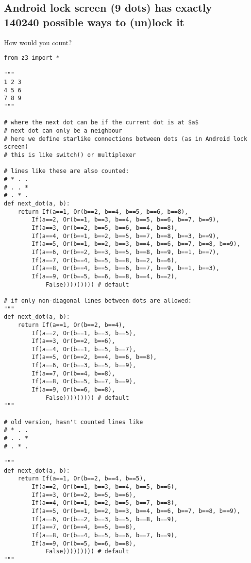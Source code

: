 \subsection{Android lock screen (9 dots) has exactly 140240 possible ways to (un)lock it}

How would you count?

\begin{lstlisting}[style=custompy]
from z3 import *

"""
1 2 3
4 5 6
7 8 9
"""

# where the next dot can be if the current dot is at $a$
# next dot can only be a neighbour
# here we define starlike connections between dots (as in Android lock screen)
# this is like switch() or multiplexer

# lines like these are also counted:
# * . .
# . . *
# . * .
def next_dot(a, b):
    return If(a==1, Or(b==2, b==4, b==5, b==6, b==8),
        If(a==2, Or(b==1, b==3, b==4, b==5, b==6, b==7, b==9),
        If(a==3, Or(b==2, b==5, b==6, b==4, b==8),
        If(a==4, Or(b==1, b==2, b==5, b==7, b==8, b==3, b==9),
        If(a==5, Or(b==1, b==2, b==3, b==4, b==6, b==7, b==8, b==9),
        If(a==6, Or(b==2, b==3, b==5, b==8, b==9, b==1, b==7),
        If(a==7, Or(b==4, b==5, b==8, b==2, b==6),
        If(a==8, Or(b==4, b==5, b==6, b==7, b==9, b==1, b==3),
        If(a==9, Or(b==5, b==6, b==8, b==4, b==2),
            False))))))))) # default

# if only non-diagonal lines between dots are allowed:
"""
def next_dot(a, b):
    return If(a==1, Or(b==2, b==4),
        If(a==2, Or(b==1, b==3, b==5),
        If(a==3, Or(b==2, b==6),
        If(a==4, Or(b==1, b==5, b==7),
        If(a==5, Or(b==2, b==4, b==6, b==8),
        If(a==6, Or(b==3, b==5, b==9),
        If(a==7, Or(b==4, b==8),
        If(a==8, Or(b==5, b==7, b==9),
        If(a==9, Or(b==6, b==8),
            False))))))))) # default
"""

# old version, hasn't counted lines like
# * . .
# . . *
# . * .

"""
def next_dot(a, b):
    return If(a==1, Or(b==2, b==4, b==5),
        If(a==2, Or(b==1, b==3, b==4, b==5, b==6),
        If(a==3, Or(b==2, b==5, b==6),
        If(a==4, Or(b==1, b==2, b==5, b==7, b==8),
        If(a==5, Or(b==1, b==2, b==3, b==4, b==6, b==7, b==8, b==9),
        If(a==6, Or(b==2, b==3, b==5, b==8, b==9),
        If(a==7, Or(b==4, b==5, b==8),
        If(a==8, Or(b==4, b==5, b==6, b==7, b==9),
        If(a==9, Or(b==5, b==6, b==8),
            False))))))))) # default
"""


\end{lstlisting}
